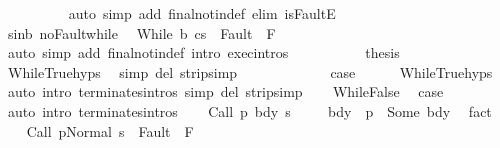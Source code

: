 \begin{isabellebody}
\ \ \ \ \ \ \ \ \isamarkupfalse%
\ {\isacharparenleft}auto\ simp\ add{\isacharcolon}\ final{\isacharunderscore}notin{\isacharunderscore}def\ elim{\isacharbang}{\isacharcolon}\ isFaultE{\isacharparenright}\isanewline
\ \ \ \ \ \ \isamarkupfalse%
\ s{\isacharunderscore}in{\isacharunderscore}b\ noFault{\isacharunderscore}while\ \isamarkupfalse%
\ {\isachardoublequoteopen}{\isasymGamma}{\isasymturnstile}{\isasymlangle}While\ b\ c{\isacharcomma}s{\isacharprime}\ {\isasymrangle}\ {\isasymRightarrow}{\isasymnotin}Fault\ {\isacharbackquote}\ F{\isachardoublequoteclose}\isanewline
\ \ \ \ \ \ \ \ \isamarkupfalse%
\ {\isacharparenleft}auto\ simp\ add{\isacharcolon}\ final{\isacharunderscore}notin{\isacharunderscore}def\ intro{\isacharcolon}\ exec{\isachardot}intros{\isacharparenright}\isanewline
\ \ \ \ \ \ \isamarkupfalse%
\ {\isacharasterisk}\ \isamarkupfalse%
\ {\isacharquery}thesis\isanewline
\ \ \ \ \ \ \ \ \isamarkupfalse%
\ WhileTrue{\isachardot}hyps\ \isamarkupfalse%
\ {\isacharparenleft}simp\ del{\isacharcolon}\ strip{\isacharunderscore}simp{\isacharparenright}\isanewline
\ \ \ \ \isamarkupfalse%
\isanewline
\ \ \isacommand{{\isacharbraceright}}\isamarkupfalse%
\isanewline
\ \ \isamarkupfalse%
\ \isamarkupfalse%
\ {\isacharquery}case\isanewline
\ \ \ \ \isamarkupfalse%
\ WhileTrue{\isachardot}hyps\ \isamarkupfalse%
\ {\isacharparenleft}auto\ intro{\isacharcolon}\ terminates{\isachardot}intros\ simp\ del{\isacharcolon}\ strip{\isacharunderscore}simp{\isacharparenright}\isanewline
{}\isamarkupfalse%
\isanewline
\ \ \isamarkupfalse%
\ WhileFalse\ \isamarkupfalse%
\ {\isacharquery}case\ \isamarkupfalse%
\ {\isacharparenleft}auto\ intro{\isacharcolon}\ terminates{\isachardot}intros{\isacharparenright}\isanewline
{}\isamarkupfalse%
\isanewline
\ \ \isamarkupfalse%
\ {\isacharparenleft}Call\ p\ bdy\ s{\isacharparenright}\ \isanewline
\ \ \isamarkupfalse%
\ bdy{\isacharcolon}\ {\isachardoublequoteopen}{\isasymGamma}\ p\ {\isacharequal}\ Some\ bdy{\isachardoublequoteclose}\ \isamarkupfalse%
\ fact\isanewline
\ \ \isamarkupfalse%
\ {\isachardoublequoteopen}{\isasymGamma}{\isasymturnstile}{\isasymlangle}Call\ p{\isacharcomma}Normal\ s\ {\isasymrangle}\ {\isasymRightarrow}{\isasymnotin}Fault\ {\isacharbackquote}\ F{\isachardoublequoteclose}\ \isamarkupfalse%

\end{isabellebody}
